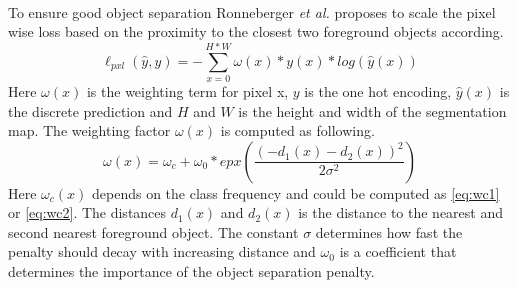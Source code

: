 \documentclass{kththesis}
\begin{document}
\\
To ensure good object separation Ronneberger \textit{et al.} \parencite{ronneberger_u-net:_2015} proposes to scale the pixel wise loss based on the proximity to the closest two foreground objects according.
\begin{equation}\label{eq:pxl_weight}
	\ell_{pxl}(\hat{y}, y) = - \sum_{x=0}^{H*W}\omega(x)*y(x)*log(\hat{y}(x))
\end{equation}
Here $\omega(x)$ is the weighting term for pixel x, $y$ is the one hot encoding, $\hat{y}(x)$ is the discrete prediction and $H$ and $W$ is the height and width of the segmentation map. The weighting factor $\omega(x)$ is computed as following.
\begin{equation}\label{eq:weight}
\omega(x)=\omega_c+\omega_0*epx(\frac{(-d_1(x)-d_2(x))^{2}}{2\sigma^2})
\end{equation}
Here $\omega_c(x)$ depends on the class frequency and could be computed as \ref{eq:wc1} or \ref{eq:wc2}. The distances $d_1(x)$ and $d_2(x)$ is the distance to the nearest and second nearest foreground object. The constant $\sigma$ determines how fast the penalty should decay with increasing distance and $\omega_0$ is a coefficient that determines the importance of the object separation penalty.
\end{document}

